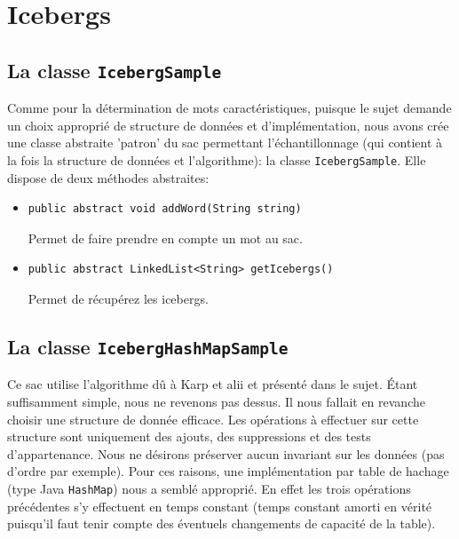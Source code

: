 \documentclass[12pt,a4paper,titlepage]{article}
\newcommand{\class}[1]{\texttt{#1}}
\begin{document}
\newpage
\section{Icebergs}

\subsection{La classe \class{IcebergSample}}

Comme pour la détermination de mots caractéristiques, puisque le sujet demande un choix approprié de structure de données et d'implémentation, nous avons crée une classe abstraite 'patron' du sac permettant l'échantillonnage (qui contient à la fois la structure de données et l'algorithme): la classe \class{IcebergSample}. Elle dispose de deux méthodes abstraites:

\begin{itemize}
\item \begin{lstlisting}
public abstract void addWord(String string)
\end{lstlisting}
Permet de faire prendre en compte un mot au sac.

\item \begin{lstlisting}
public abstract LinkedList<String> getIcebergs()
\end{lstlisting}
Permet de récupérez les icebergs.
\end{itemize}

\subsection{La classe \class{IcebergHashMapSample}}

Ce sac utilise l'algorithme dû à Karp et alii et présenté dans le sujet. Étant suffisamment simple, nous ne revenons pas dessus. Il nous fallait en revanche choisir une structure de donnée efficace. Les opérations à effectuer sur cette structure sont uniquement des ajouts, des suppressions et des tests d'appartenance. Nous ne désirons préserver aucun invariant sur les données (pas d'ordre par exemple). Pour ces raisons, une implémentation par table de hachage (type Java \class{HashMap}) nous a semblé approprié. En effet les trois opérations précédentes s'y effectuent en temps constant (temps constant amorti en vérité puisqu'il faut tenir compte des éventuels changements de capacité de la table).\\
\end{document}
